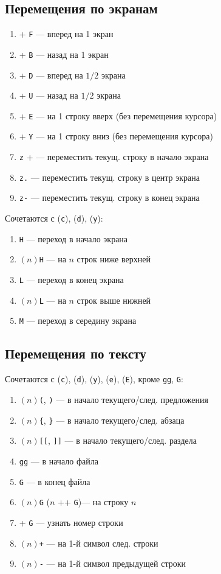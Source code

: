 \documentclass[a4paper,10pt, twocolumn]{article}
\newcommand*{\cod}[1]{\texttt{#1}}
\begin{document}
\subsection{Перемещения по экранам}
\begin{enumerate}
    \item \Ctrl + \cod{F} --- вперед на 1 экран 
    \item \Ctrl + \cod{B} --- назад на 1 экран
    \item \Ctrl + \cod{D} --- вперед на $1/2$ экрана
    \item \Ctrl + \cod{U} --- назад на $1/2$ экрана
    \item \Ctrl + \cod{E} --- на 1 строку вверх (без перемещения курсора)
    \item \Ctrl + \cod{Y} --- на 1 строку вниз (без перемещения курсора)
    \item \cod{z} + \Enter --- переместить текущ. строку в начало экрана
    \item \cod{z.} --- переместить текущ. строку в центр экрана
    \item \cod{z-} --- переместить текущ. строку в конец экрана
\end{enumerate}
Сочетаются с (\cod{c}), (\cod{d}), (\cod{y}):
\begin{enumerate}
    \item \cod{H} --- переход в начало экрана
    \item $(n)$\cod{H} --- на $n$ строк ниже верхней
    \item \cod{L} --- переход в конец экрана
    \item $(n)$\cod{L} --- на $n$ строк выше нижней
    \item \cod{M} --- переход в середину экрана
\end{enumerate}

\subsection{Перемещения по тексту}

Сочетаются с (\cod{c}), (\cod{d}), (\cod{y}), (\cod{e}), (\cod{E}), кроме \cod{gg}, \cod{G}:
\begin{enumerate}
    \item $(n)$\cod{(}, \cod{)} --- в начало текущего/след. предложения
    \item $(n)$\cod{\{}, \cod{\}} --- в начало текущего/след. абзаца
    \item $(n)$\cod{[[}, \cod{]]} --- в начало текущего/след. раздела
    \item \cod{gg} --- в начало файла
    \item \cod{G} --- в конец файла
    \item $(n)$\cod{G} ($n$ +\Ctrl + \cod{G})--- на строку $n$\
    \item \Ctrl + \cod{G} --- узнать номер строки
    \item $(n)$\cod{+} --- на 1-й символ след. строки
    \item $(n)$\cod{-} --- на 1-й символ предыдущей строки
\end{enumerate}
\end{document}
